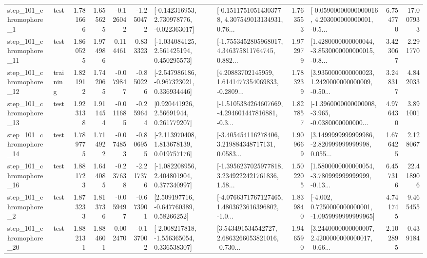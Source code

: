 \begin{tabular}{llrrrrllrlrr}
   step\_101\_chromophore\_1 &      test &      1.781666 &    1.655625 &     -0.126042 & -1.250472 &   [-0.142316953, 2.730978776, -0.022363017] &  [-0.15117510514303778, 4.307549013134931, 0.76... &       1.763553 &  [-0.05900000000000016, 4.203000000000001, -0.5... &            6.754770 &         17.007933 \\
  step\_101\_chromophore\_11 &      test &      1.860525 &    1.974986 &      0.114461 &  0.833323 &    [-1.034084125, 2.561425194, 0.450295573] &  [-1.7553452805968017, 4.346375811764745, 0.882... &       1.972979 &  [1.4280000000000044, -3.8530000000000015, -0.8... &            3.423067 &          2.291770 \\
  step\_101\_chromophore\_12 &  training &      1.821912 &    1.742065 &     -0.079847 & -0.850226 &   [-2.547986186, -0.967323021, 0.336934446] &  [4.20883702145959, 1.6141477354069833, -0.2809... &       1.783239 &  [3.9350000000000023, 1.2420000000000009, -0.50... &            3.248317 &          4.842033 \\
  step\_101\_chromophore\_13 &      test &      1.923138 &    1.911454 &     -0.011685 & -0.259644 &      [0.920441926, 2.56691944, 0.261779207] &  [-1.5105384264607669, -4.294601447816881, -0.3... &       1.827857 &  [-1.3960000000000008, -3.965, -0.0380000000000... &            4.976430 &          3.891001 \\
  step\_101\_chromophore\_14 &      test &      1.789775 &    1.714922 &     -0.074853 & -0.806955 &    [-2.113970408, 1.813678139, 0.019757176] &  [-3.405454116278406, 3.219884348717131, 0.0583... &       1.909669 &  [3.1499999999999986, -2.820999999999998, 0.055... &            1.676425 &          2.128067 \\
  step\_101\_chromophore\_16 &      test &      1.881723 &    1.644085 &     -0.237638 & -2.217376 &    [-1.082208956, 2.404801904, 0.377340997] &  [-1.3956237025977818, 3.2349222421761836, 1.58... &       1.502205 &  [1.5800000000000054, -3.780999999999999, -0.13... &            6.457316 &         22.418906 \\
   step\_101\_chromophore\_2 &      test &      1.873233 &    1.813736 &     -0.059497 & -0.673901 &     [2.509197716, -0.647760389, 0.58266252] &  [-4.0766371767127465, 1.4803623616396802, -1.0... &       1.839840 &  [-4.002, 0.7250000000000001, -1.0959999999999965] &            4.741745 &          9.465455 \\
  step\_101\_chromophore\_20 &      test &      1.882131 &    1.884601 &      0.002470 & -0.137002 &   [-2.008217818, -1.556365054, 0.336538307] &  [3.543491534542727, 2.6863266053821016, -0.730... &       1.946590 &  [3.2440000000000007, 2.4200000000000017, -0.66... &            2.102895 &          0.439184 \\

\end{tabular}
